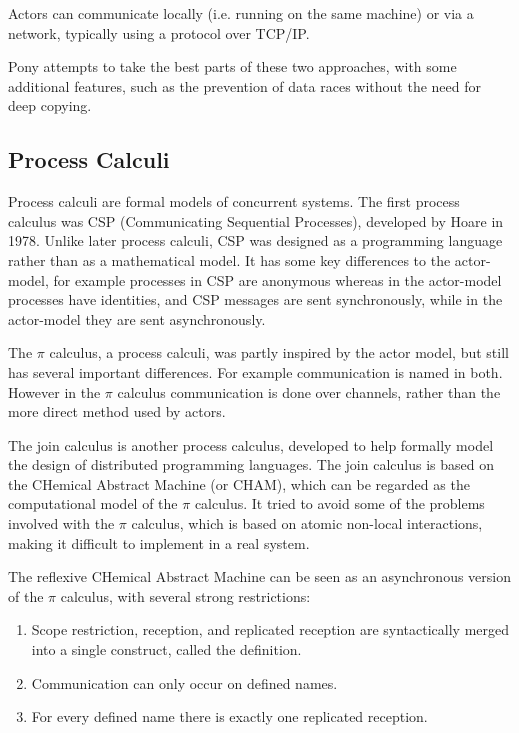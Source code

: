 \documentclass[11pt,a4paper]{report}
\begin{document}
Actors can communicate locally (i.e. running on the same machine) or via a network, typically using a protocol over TCP/IP.

Pony attempts to take the best parts of these two approaches, with some additional features, such as the prevention of data races without the need for deep copying.

\subsection{Process Calculi}

Process calculi are formal models of concurrent systems.
The first process calculus was CSP (Communicating Sequential Processes), developed by Hoare in 1978\cite{hoare1978}.
Unlike later process calculi, CSP was designed as a programming language rather than as a mathematical model.
It has some key differences to the actor-model, for example processes in CSP are anonymous whereas in the actor-model processes have identities, and CSP messages are sent synchronously, while in the actor-model they are sent asynchronously.

The $\pi$ calculus\cite{milner1999communicating}, a process calculi, was partly inspired by the actor model, but still has several important differences.
For example communication is named in both.
However in the $\pi$ calculus communication is done over channels, rather than the more direct method used by actors.

The join calculus is another process calculus, developed to help formally model the design of distributed programming languages\cite{fournet1996}.
The join calculus is based on the CHemical Abstract Machine (or CHAM), which can be regarded as the computational model of the $\pi$ calculus.
It tried to avoid some of the problems involved with the $\pi$ calculus\cite{milner1989}, which is based on atomic non-local interactions, making it difficult to implement in a real system.

The reflexive CHemical Abstract Machine can be seen as an asynchronous version of the $\pi$ calculus\cite{fournet1996}, with several strong restrictions:
\begin{enumerate}[noitemsep]
	\item Scope restriction, reception, and replicated reception are syntactically merged into a single construct, called the definition.
	\item Communication can only occur on defined names.
	\item For every defined name there is exactly one replicated reception.
\end{enumerate}
\end{document}
